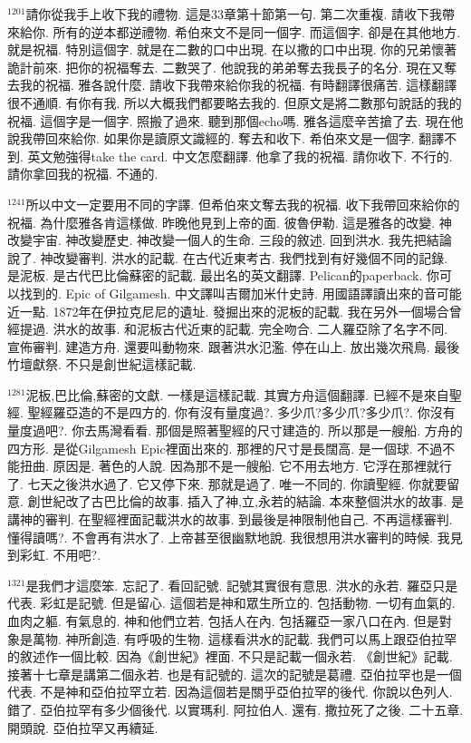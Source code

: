 \documentclass{book}
\begin{document}
$^{1201}$請你從我手上收下我的禮物.
這是33章第十節第一句.
第二次重複.
請收下我帶來給你.
所有的逆本都逆禮物.
希伯來文不是同一個字.
而這個字.
卻是在其他地方.
就是祝福.
特別這個字.
就是在二數的口中出現.
在以撒的口中出現.
你的兄弟懷著詭計前來.
把你的祝福奪去.
二數哭了.
他說我的弟弟奪去我長子的名分.
現在又奪去我的祝福.
雅各說什麼.
請收下我帶來給你我的祝福.
有時翻譯很痛苦.
這樣翻譯很不通順.
有你有我.
所以大概我們都要略去我的.
但原文是將二數那句說話的我的祝福.
這個字是一個字.
照搬了過來.
聽到那個echo嗎.
雅各這麼辛苦搶了去.
現在他說我帶回來給你.
如果你是讀原文識經的.
奪去和收下.
希伯來文是一個字.
翻譯不到.
英文勉強得take the card.
中文怎麼翻譯.
他拿了我的祝福.
請你收下.
不行的.
請你拿回我的祝福.
不通的.

$^{1241}$所以中文一定要用不同的字譯.
但希伯來文奪去我的祝福.
收下我帶回來給你的祝福.
為什麼雅各肯這樣做.
昨晚他見到上帝的面.
彼魯伊勒.
這是雅各的改變.
神改變宇宙.
神改變歷史.
神改變一個人的生命.
三段的敘述.
回到洪水.
我先把結論說了.
神改變審判.
洪水的記載.
在古代近東考古.
我們找到有好幾個不同的記錄.
是泥板.
是古代巴比倫蘇密的記載.
最出名的英文翻譯.
Pelican的paperback.
你可以找到的.
Epic of Gilgamesh.
中文譯叫吉爾加米什史詩.
用國語譯讀出來的音可能近一點.
1872年在伊拉克尼尼的遺址.
發掘出來的泥板的記載.
我在另外一個場合曾經提過.
洪水的故事.
和泥板古代近東的記載.
完全吻合.
二人羅亞除了名字不同.
宣佈審判.
建造方舟.
還要叫動物來.
跟著洪水氾濫.
停在山上.
放出幾次飛鳥.
最後竹壇獻祭.
不只是創世紀這樣記載.

$^{1281}$泥板,巴比倫,蘇密的文獻.
一樣是這樣記載.
其實方舟這個翻譯.
已經不是來自聖經.
聖經羅亞造的不是四方的.
你有沒有量度過?.
多少爪?多少爪?多少爪?.
你沒有量度過吧?.
你去馬灣看看.
那個是照著聖經的尺寸建造的.
所以那是一艘船.
方舟的四方形.
是從Gilgamesh Epic裡面出來的.
那裡的尺寸是長闊高.
是一個球.
不過不能扭曲.
原因是.
著色的人說.
因為那不是一艘船.
它不用去地方.
它浮在那裡就行了.
七天之後洪水過了.
它又停下來.
那就是過了.
唯一不同的.
你讀聖經.
你就要留意.
創世紀改了古巴比倫的故事.
插入了神,立,永若的結論.
本來整個洪水的故事.
是講神的審判.
在聖經裡面記載洪水的故事.
到最後是神限制他自己.
不再這樣審判.
懂得讀嗎?.
不會再有洪水了.
上帝甚至很幽默地說.
我很想用洪水審判的時候.
我見到彩虹.
不用吧?.

$^{1321}$是我們才這麼笨.
忘記了.
看回記號.
記號其實很有意思.
洪水的永若.
羅亞只是代表.
彩虹是記號.
但是留心.
這個若是神和眾生所立的.
包括動物.
一切有血氣的.
血肉之軀.
有氣息的.
神和他們立若.
包括人在內.
包括羅亞一家八口在內.
但是對象是萬物.
神所創造.
有呼吸的生物.
這樣看洪水的記載.
我們可以馬上跟亞伯拉罕的敘述作一個比較.
因為《創世紀》裡面.
不只是記載一個永若.
《創世紀》記載.
接著十七章是講第二個永若.
也是有記號的.
這次的記號是葛禮.
亞伯拉罕也是一個代表.
不是神和亞伯拉罕立若.
因為這個若是關乎亞伯拉罕的後代.
你說以色列人.
錯了.
亞伯拉罕有多少個後代.
以實瑪利.
阿拉伯人.
還有.
撒拉死了之後.
二十五章.
開頭說.
亞伯拉罕又再續延.
\end{document}
